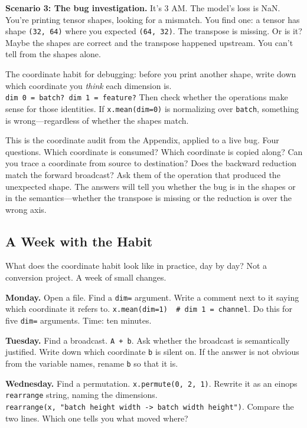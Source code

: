 \documentclass[11pt,titlepage]{article}
\begin{document}
\textbf{Scenario 3: The bug investigation.} It's 3 AM. The model's loss
is NaN. You're printing tensor shapes, looking for a mismatch. You find
one: a tensor has shape \texttt{(32,\ 64)} where you expected
\texttt{(64,\ 32)}. The transpose is missing. Or is it? Maybe the shapes
are correct and the transpose happened upstream. You can't tell from the
shapes alone.

The coordinate habit for debugging: before you print another shape,
write down which coordinate you \emph{think} each dimension is.
\texttt{dim\ 0\ =\ batch?\ dim\ 1\ =\ feature?} Then check whether the
operations make sense for those identities. If \texttt{x.mean(dim=0)} is
normalizing over \texttt{batch}, something is wrong---regardless of
whether the shapes match.

This is the coordinate audit from the Appendix, applied to a live bug.
Four questions. Which coordinate is consumed? Which coordinate is copied
along? Can you trace a coordinate from source to destination? Does the
backward reduction match the forward broadcast? Ask them of the
operation that produced the unexpected shape. The answers will tell you
whether the bug is in the shapes or in the semantics---whether the
transpose is missing or the reduction is over the wrong axis.

\vspace{2em}

\hypertarget{a-week-with-the-habit}{%
\subsection{A Week with the Habit}\label{a-week-with-the-habit}}

What does the coordinate habit look like in practice, day by day? Not a
conversion project. A week of small changes.

\textbf{Monday.} Open a file. Find a \texttt{dim=} argument. Write a
comment next to it saying which coordinate it refers to.
\texttt{x.mean(dim=1)\ \ \#\ dim\ 1\ =\ channel}. Do this for five
\texttt{dim=} arguments. Time: ten minutes.

\textbf{Tuesday.} Find a broadcast. \texttt{A\ +\ b}. Ask whether the
broadcast is semantically justified. Write down which coordinate
\texttt{b} is silent on. If the answer is not obvious from the variable
names, rename \texttt{b} so that it is.

\textbf{Wednesday.} Find a permutation. \texttt{x.permute(0,\ 2,\ 1)}.
Rewrite it as an einops \texttt{rearrange} string, naming the
dimensions.
\texttt{rearrange(x,\ "batch\ height\ width\ -\textgreater{}\ batch\ width\ height")}.
Compare the two lines. Which one tells you what moved where?
\end{document}
